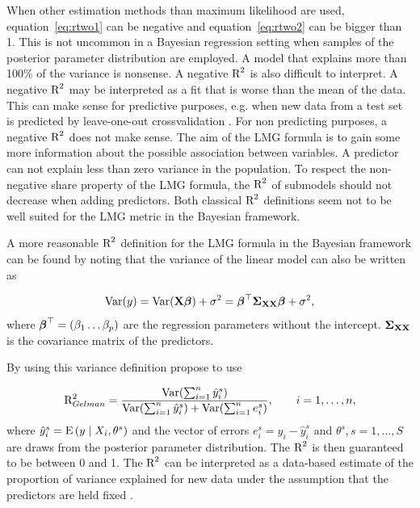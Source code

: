 \documentclass[11pt,a4paper,twoside]{book}\usepackage[]{graphicx}\usepackage[]{color}
\begin{document}
When other estimation methods than maximum likelihood are used, equation~\eqref{eq:rtwo1} can be negative and equation~\eqref{eq:rtwo2}  can be bigger than 1. This is not uncommon in a Bayesian regression setting when samples of the posterior parameter distribution are employed. A model that explains more than 100\% of the variance is nonsense. A negative $\text{R}^2$ is also difficult to interpret. A negative $\text{R}^2$ may be interpreted as a fit that is worse than the mean of the data. This can make sense for predictive purposes, e.g. when new data from a test set is predicted by leave-one-out crossvalidation \citep{Alexander2015}.  For non predicting purposes, a negative $\text{R}^2$ does not make sense. The aim of the LMG formula is to gain some more information about the possible association between variables. A predictor can not explain less than zero variance in the population. To respect the non-negative share property of the LMG formula, the $\text{R}^2$ of submodels should not decrease when adding predictors. Both classical $\text{R}^2$ definitions seem not to be well suited for the LMG metric in the Bayesian framework.

A more reasonable $\text{R}^2$ definition for the LMG formula in the Bayesian framework can be found by noting that the variance of the linear model can also be written as 

      \begin{align} 
        \operatorname{Var}(y) = \operatorname{Var}({\mathbf{X}} {\boldsymbol{\beta}}) + \sigma^2 = {\boldsymbol{\beta}}^\top {\boldsymbol{\Sigma}}{}_{{\mathbf{X}} {\mathbf{X}}}  {\boldsymbol{\beta}} + \sigma^2, \label{eq:vary} 
   \end{align}
where ${\boldsymbol{\beta}}^\top = (\beta_{1} \dots \beta_{p})$ are the regression parameters without the intercept.
${\boldsymbol{\Sigma}}{}_{{\mathbf{X}} {\mathbf{X}}}$ is the covariance matrix of the predictors.

By using this variance definition \cite{Gelman2017} propose to use 

      \begin{align} 
       \text{R}^2_{Gelman} = \frac{\operatorname{Var}(\sum_{i=1}^{n}\hat{y}^s_{i})}{\operatorname{Var}(\sum_{i=1}^{n}\hat{y}^s_{i})+\operatorname{Var}(\sum_{i=1}^{n}e^s_{i})}, \qquad i = 1,\dots,n, \label{eq:rtwoGelman} 
   \end{align} 
where $\hat{y}^s_{i}  = \operatorname{E} \left({y \mid X_{i}, \theta^s}\right) $ and the vector of errors $e^s_{i} = y_{i} - \hat{y}^s_{i}$ and $\theta^s, s = 1,\dotsc, S$ are draws from the posterior parameter distribution. The $\text{R}^2$ is then guaranteed to be between 0 and 1. The $\text{R}^2$ can  be interpreted as a data-based estimate of the proportion of variance explained for new data under the assumption that the predictors are held fixed \citep{Gelman2017}.
\end{document}
